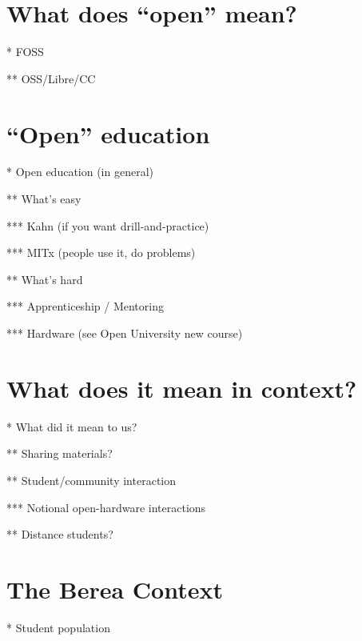 
\begin{comment} %
* distributed / open source design is hard
* what does it mean for the course to be open?

* asked what would it mean for a course to be open; decided that we'd be designing for everyone and chose to focus on particular context
* developed personas & worked on understanding values in the context
* realized that distributed & open (course) design is incredibly hard
\end{comment}

\section{What does ``open'' mean?}

* FOSS

** OSS/Libre/CC

\section{``Open'' education}

* Open education (in general)

** What's easy

*** Kahn (if you want drill-and-practice)

*** MITx (people use it, do problems)

** What's hard

*** Apprenticeship / Mentoring

*** Hardware (see Open University new course)

\section{What does it mean in context?}

* What did it mean to us?

** Sharing materials?

** Student/community interaction

*** Notional open-hardware interactions

** Distance students?

\section{The Berea Context}

* Student population

